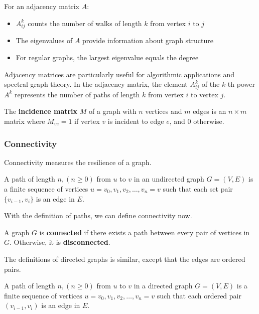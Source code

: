 \documentclass[oneside]{book}
\begin{document}
\begin{theorem}
For an adjacency matrix $A$:
\begin{itemize}
    \item $A^k_{ij}$ counts the number of walks of length $k$ from vertex $i$ to $j$
    \item The eigenvalues of $A$ provide information about graph structure
    \item For regular graphs, the largest eigenvalue equals the degree
\end{itemize}
\end{theorem}

Adjacency matrices are particularly useful for algorithmic applications and spectral graph theory. In the adjacency matrix, the element $A^k_{ij}$ of the $k$-th power $A^k$ represents the number of paths of length $k$ from vertex $i$ to vertex $j$.

\begin{definition}
The \textbf{incidence matrix} $M$ of a graph with $n$ vertices and $m$ edges is an $n \times m$ matrix where $M_{ve} = 1$ if vertex $v$ is incident to edge $e$, and $0$ otherwise.
\end{definition}

\subsubsection{Connectivity}

Connectivity measures the resilience of a graph.

\begin{definition}
A path of length $n,(n \geq 0)$ from $u$ to $v$ in an undirected graph $G=(V,E)$ is a finite sequence of vertices $u = v_0, v_1, v_2, \ldots, v_n = v$ such that each set pair $\{v_{i-1}, v_i\}$ is an edge in $E$.
\end{definition}

With the definition of paths, we can define connectivity now.

\begin{definition}
A graph $G$ is \textbf{connected} if there exists a path between every pair of vertices in $G$. Otherwise, it is \textbf{disconnected}.
\end{definition}

The definitions of directed graphs is similar, except that the edges are ordered pairs.

\begin{definition}
A path of length $n,(n \geq 0)$ from $u$ to $v$ in a directed graph $G=(V,E)$ is a finite sequence of vertices $u = v_0, v_1, v_2, \ldots, v_n = v$ such that each ordered pair $(v_{i-1}, v_i)$ is an edge in $E$.
\end{definition}
\end{document}
